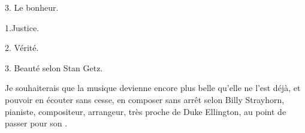 \documentclass[11pt,twoside,openany]{book}
\newenvironment{lateiDocument}{}{}
\begin{document}
\begin{lateiDocument}
\begin{teiElement}[name={TEI},change={commons\_edition}]
\begin{teiElement}[name={text},type={book},xmlid={book}]
\begin{teiElement}[name={group},type={book},xmlid={book-001}]
\begin{teiElement}[name={group},type={section1},xmlid={section1-003}]
\begin{teiElement}
\begin{teiElement}[name={body},xmlid={body-013}]
\begin{teiDiv}[type={section1},xmlid={div03-8}]
\begin{teiCit}[xmlid={cit05-6}]
\end{teiCit}
              \begin{teiCit}[xmlid={cit06-5}]

                \begin{teiQuote}
3. Le bonheur.
\end{teiQuote}
              
\end{teiCit}
              \begin{teiCit}[xmlid={cit07-3}]

                \begin{teiQuote}
1.Justice.
\end{teiQuote}
              
\end{teiCit}
              \begin{teiCit}[xmlid={cit08-3}]

                \begin{teiQuote}
2. Vérité.
\end{teiQuote}
              
\end{teiCit}
              \begin{teiCit}[xmlid={cit09-2}]

                \begin{teiQuote}
3. Beauté \lbrack{}selon Stan Getz\rbrack{}.
\end{teiQuote}
              
\end{teiCit}
              \begin{teiCit}[xmlid={cit10-2}]

                \begin{teiQuote}
Je souhaiterais que la musique devienne encore plus belle qu’elle ne l’est déjà, et pouvoir en écouter sans cesse, en composer sans arrêt \lbrack{}selon Billy Strayhorn, pianiste, compositeur, arrangeur, très proche de Duke Ellington, au point de passer pour son \rbrack{}.
\end{teiQuote}
              

\end{teiCit}
\end{teiDiv}
\end{teiElement}
\end{teiElement}
\end{teiElement}
\end{teiElement}
\end{teiElement}
\end{teiElement}
\end{lateiDocument}
\end{document}
